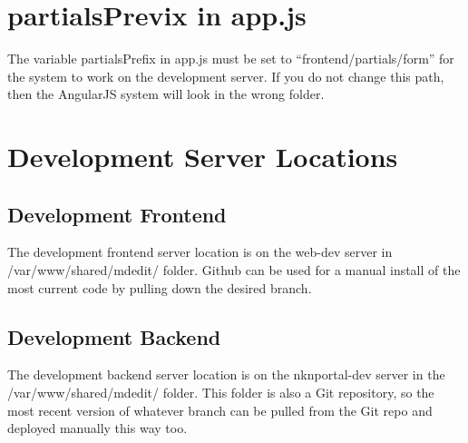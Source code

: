 \documentclass[a4paper, 12pt]{article}
\begin{document}
\section{partialsPrevix in app.js}
\par\indent
The variable partialsPrefix in app.js must be set to ``frontend/partials/form'' for the system to work on the development server. If you do not change this path, then the AngularJS system will look in the wrong folder.

\section{Development Server Locations}
\subsection{Development Frontend}
\par\indent
The development frontend server location is on the web-dev server in /var/www/shared/mdedit/ folder. Github can be used for a manual install of the most current code by pulling down the desired branch. 

\subsection{Development Backend}
\par\indent
The development backend server location is on the nknportal-dev server in the /var/www/shared/mdedit/ folder. This folder is also a Git repository, so the most recent version of whatever branch can be pulled from the Git repo and deployed manually this way too.
\end{document}
